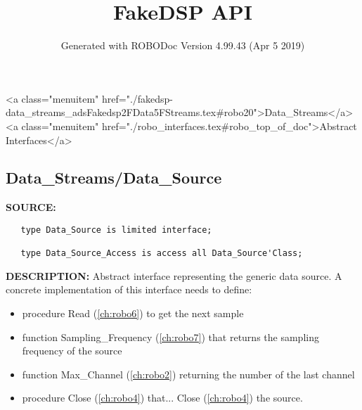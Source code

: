 \documentclass{article}
\title{FakeDSP API}
\author{Generated with ROBODoc Version 4.99.43 (Apr  5 2019)
}
\begin{document}
\maketitle
\printindex
\tableofcontents
\newpage

<a class="menuitem" href="./fakedsp-data_streams_adsFakedsp2FData5FStreams.tex#robo20">Data_Streams</a><a class="menuitem" href="./robo_interfaces.tex#robo_top_of_doc">Abstract Interfaces</a>\subsection{Data\_Streams/Data\_Source}
\textbf{SOURCE:}\hspace{0.08in}\begin{verbatim}
   type Data_Source is limited interface;

   type Data_Source_Access is access all Data_Source'Class;
\end{verbatim}
\textbf{DESCRIPTION:}\hspace{0.08in}
   Abstract interface representing the generic data source.
   A concrete implementation of this interface needs to define:

\begin{itemize}
  \item    procedure Read (\ref{ch:robo6}) to get the next sample
  \item    function Sampling\_Frequency (\ref{ch:robo7}) that returns the
     sampling frequency of the source
  \item    function Max\_Channel (\ref{ch:robo2}) returning the number of the
     last channel
  \item    procedure Close (\ref{ch:robo4}) that... Close (\ref{ch:robo4}) the source.
\end{itemize}
\end{document}
